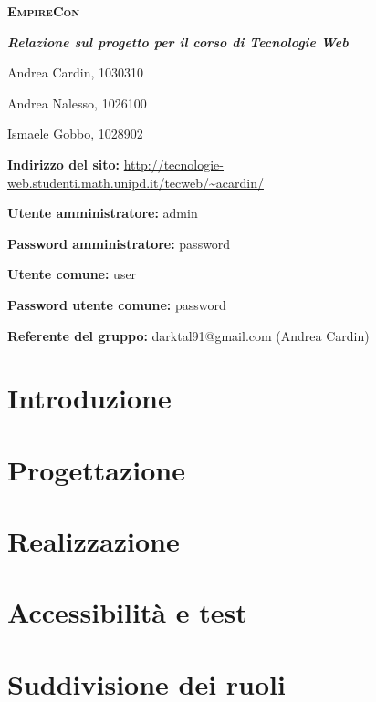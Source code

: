 \documentclass[12pt,a4paper]{article}
\begin{document}
\begin{titlepage}
	\centering
	\vspace*{1cm}
	{\scshape\LARGE \textbf{EmpireCon} \par}
	\vspace{0.5cm}
	{\Large \textbf{\textit{Relazione sul progetto per il corso di Tecnologie Web}}\par}
	\vspace{3cm}
	{\Large Andrea Cardin, 1030310\par}
	{\Large Andrea Nalesso, 1026100\par}
	{\Large Ismaele Gobbo, 1028902\par}
	\vspace{6cm}
	{\normalsize \textbf{Indirizzo del sito:} \url{http://tecnologie-web.studenti.math.unipd.it/tecweb/~acardin/}\par}
	{\normalsize \textbf{Utente amministratore:} admin\par}
	{\normalsize \textbf{Password amministratore:} password\par}
	{\normalsize \textbf{Utente comune:} user\par}
	{\normalsize \textbf{Password utente comune:} password\par}
	{\normalsize \textbf{Referente del gruppo:} darktal91@gmail.com (Andrea Cardin)\par}
	\vspace*{\fill}
\end{titlepage}

\tableofcontents
\newpage

% 
% 

\section{Introduzione}


\section{Progettazione}


\section{Realizzazione}


\section{Accessibilità e test}




\section{Suddivisione dei ruoli}

\end{document}
